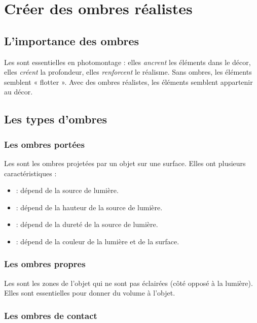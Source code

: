 \section{Créer des ombres réalistes}

\subsection{L'importance des ombres}

Les  sont essentielles en photomontage : elles \emph{ancrent} les éléments dans le décor, elles \emph{créent} la profondeur, elles \emph{renforcent} le réalisme. Sans ombres, les éléments semblent « flotter ». Avec des ombres réalistes, les éléments semblent appartenir au décor.

\subsection{Les types d'ombres}

\subsubsection{Les ombres portées}

Les  sont les ombres projetées par un objet sur une surface. Elles ont plusieurs caractéristiques :

\begin{itemize}
    \item {} : dépend de la source de lumière.
    \item {} : dépend de la hauteur de la source de lumière.
    \item {} : dépend de la dureté de la source de lumière.
    \item {} : dépend de la couleur de la lumière et de la surface.
\end{itemize}

\subsubsection{Les ombres propres}

Les  sont les zones de l'objet qui ne sont pas éclairées (côté opposé à la lumière). Elles sont essentielles pour donner du volume à l'objet.

\subsubsection{Les ombres de contact}

